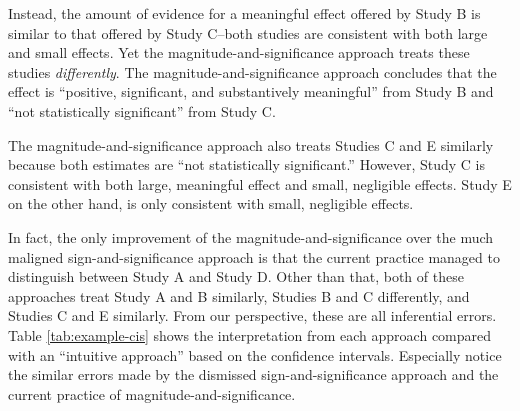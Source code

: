 \documentclass[12pt]{article}
\begin{document}
Instead, the amount of evidence for a meaningful effect offered by Study B is similar to that offered by Study C--both studies are consistent with both large and small effects. Yet the magnitude-and-significance approach treats these studies \emph{differently}. The magnitude-and-significance approach concludes that the effect is ``positive, significant, and substantively meaningful'' from Study B and ``not statistically significant'' from Study C.

The magnitude-and-significance approach also treats Studies C and E similarly because both estimates are ``not statistically significant.'' However, Study C is consistent with both large, meaningful effect and small, negligible effects. Study E on the other hand, is only consistent with small, negligible effects.

In fact, the only improvement of the magnitude-and-significance over the much maligned sign-and-significance approach is that the current practice managed to distinguish between Study A and Study D. Other than that, both of these approaches treat Study A and B similarly, Studies B and C differently, and Studies C and E similarly. From our perspective, these are all inferential errors. Table \ref{tab:example-cis} shows the interpretation from each approach compared with an ``intuitive approach'' based on the confidence intervals. Especially notice the similar errors made by the dismissed sign-and-significance approach and the current practice of magnitude-and-significance.
\end{document}
